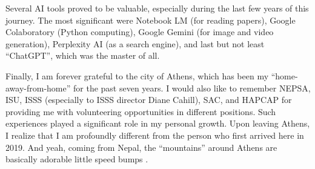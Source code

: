 
Several AI tools proved to be valuable, especially during the last few years of this journey. The most significant were Notebook LM (for reading papers), Google Colaboratory (Python computing), Google Gemini (for image and video generation), Perplexity AI (as a search engine), and last but not least ``ChatGPT'', which was the master of all.


Finally, I am forever grateful to the city of Athens, which has been my ``home-away-from-home'' for the past seven years. I would also like to remember NEPSA, ISU, ISSS (especially to ISSS director Diane Cahill), SAC, and HAPCAP for providing me with volunteering opportunities in different positions. Such experiences played a significant role in my personal growth. Upon leaving Athens, I realize that I am profoundly different from the person who first arrived here in 2019. And yeah, coming from Nepal, the ``mountains'' around Athens are basically adorable little speed bumps \textcolor{orange}{\smiley}.
